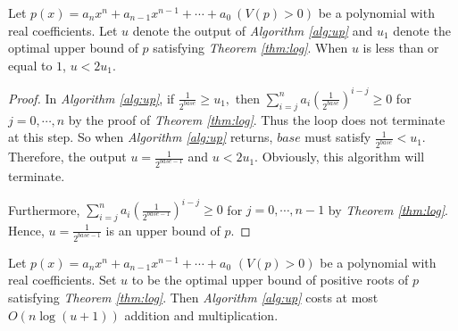 \begin{theorem}
	\label{thm:two}
	Let $p(x)=a_nx^n+a_{n-1}x^{n-1}+\cdots+a_0\ (V(p)> 0)$ be a polynomial with real coefficients. Let  $u$ denote the output of {\em Algorithm \ref{alg:up}} and $u_1$ denote the optimal upper bound of $p$ satisfying
	{\em Theorem \ref{thm:log}}. When $u$ is less than or equal to $1$, $u<2u_1$.
	
\end{theorem}


\begin{proof}
	In {\em Algorithm \ref{alg:up}}, if  $\frac{1}{2^{base}}\ge u_1,$ then $ \sum_{i=j}^na_i\left( {\frac{1}{2^{base}} }
	\right)^{i-j} \ge 0$ for $j=0,\cdots, n$ by the proof of {\em Theorem \ref{thm:log}}. Thus
	the loop does not terminate at this step.
	So when {\em Algorithm \ref{alg:up}} returns, $base$ must satisfy $\frac{1}{2^{base}}<u_1$. Therefore, the output $u=\frac{1}{2^{base-1}}$ and $u<2u_1$.
	Obviously, this algorithm will terminate.
	
	Furthermore,  $ \sum_{i=j}^na_i\left( {\frac{1}{2^{base-1}} } \right)^{i-j}\ge 0$ for $j=0,\cdots, n-1$ by {\em Theorem \ref{thm:log}}. Hence, $u=\frac{1}{2^{base-1}}$ is an upper bound of $p$.
\end{proof}

\begin{corollary}
	Let $p(x)=a_nx^n+a_{n-1}x^{n-1}+\cdots+a_0$ $ (V(p)> 0)$ be a polynomial with real coefficients. Set $u$ to be the optimal upper bound of positive roots of $p$ satisfying {\em Theorem	\ref{thm:log}}. Then  {\em Algorithm \ref{alg:up}} costs at most $O(n\log(u+1))$  addition and multiplication. %
\end{corollary}


